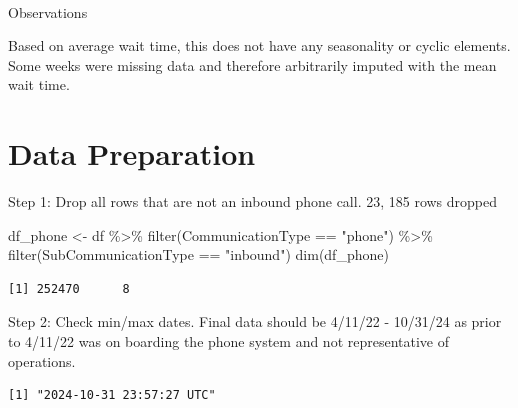 \documentclass[
  letterpaper,
  DIV=11,
  numbers=noendperiod]{scrartcl}
\makeatletter
\let\oldparagraph\paragraph
\renewcommand{\paragraph}{
    \@ifstar
      \xxxParagraphStar
      \xxxParagraphNoStar
  }
\newcommand{\xxxParagraphStar}[1]{\oldparagraph*{#1}\mbox{}}
\newcommand{\xxxParagraphNoStar}[1]{\oldparagraph{#1}\mbox{}}
\newenvironment{Shaded}{\begin{snugshade}}{\end{snugshade}}
\newcommand{\FunctionTok}[1]{\textcolor[rgb]{0.28,0.35,0.67}{#1}}
\newcommand{\NormalTok}[1]{\textcolor[rgb]{0.00,0.23,0.31}{#1}}
\newcommand{\OtherTok}[1]{\textcolor[rgb]{0.00,0.23,0.31}{#1}}
\newcommand{\SpecialCharTok}[1]{\textcolor[rgb]{0.37,0.37,0.37}{#1}}
\newcommand{\StringTok}[1]{\textcolor[rgb]{0.13,0.47,0.30}{#1}}
\makeatother
\begin{document}
\paragraph{Observations}\label{observations-9}

Based on average wait time, this does not have any seasonality or cyclic
elements. Some weeks were missing data and therefore arbitrarily imputed
with the mean wait time.

\section{Data Preparation}\label{data-preparation}

Step 1: Drop all rows that are not an inbound phone call. 23, 185 rows
dropped

\begin{Shaded}
\begin{Highlighting}[]
\NormalTok{df\_phone }\OtherTok{\textless{}{-}}\NormalTok{ df }\SpecialCharTok{\%\textgreater{}\%}
  \FunctionTok{filter}\NormalTok{(CommunicationType }\SpecialCharTok{==} \StringTok{"phone"}\NormalTok{) }\SpecialCharTok{\%\textgreater{}\%}
  \FunctionTok{filter}\NormalTok{(SubCommunicationType }\SpecialCharTok{==} \StringTok{"inbound"}\NormalTok{)}
  \FunctionTok{dim}\NormalTok{(df\_phone)}
\end{Highlighting}
\end{Shaded}

\begin{verbatim}
[1] 252470      8
\end{verbatim}

Step 2: Check min/max dates. Final data should be 4/11/22 - 10/31/24 as
prior to 4/11/22 was on boarding the phone system and not representative
of operations.

\begin{Shaded}
\end{Shaded}

\begin{verbatim}
[1] "2024-10-31 23:57:27 UTC"
\end{verbatim}
\end{document}
